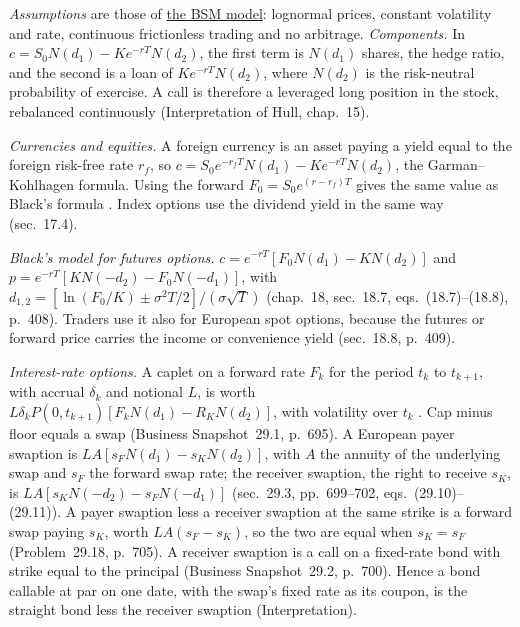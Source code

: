 \begin{qfmethod}\label{meth:black-model-rates-currencies}
 \emph{Assumptions} are those of \hyperref[mod:black-scholes-merton]{the BSM model}: lognormal prices, constant volatility and rate, continuous frictionless trading and no arbitrage. \emph{Components.} In $c=S_0N(d_1)-Ke^{-rT}N(d_2)$, the first term is $N(d_1)$ shares, the hedge ratio, and the second is a loan of $Ke^{-rT}N(d_2)$, where $N(d_2)$ is the risk-neutral probability of exercise. A call is therefore a leveraged long position in the stock, rebalanced continuously (Interpretation of Hull, chap.~15).

\emph{Currencies and equities.} A foreign currency is an asset paying a yield equal to the foreign risk-free rate $r_f$, so $c=S_0e^{-r_fT}N(d_1)-Ke^{-rT}N(d_2)$, the Garman--Kohlhagen formula. Using the forward $F_0=S_0e^{(r-r_f)T}$ gives the same value as Black's formula \citep[chap.~17, sec.~17.5, eqs.~(17.11)--(17.14), pp.~394--395]{s7-hulloptions}. Index options use the dividend yield in the same way (sec.~17.4).

\emph{Black's model for futures options.} $c=e^{-rT}[F_0N(d_1)-KN(d_2)]$ and $p=e^{-rT}[KN(-d_2)-F_0N(-d_1)]$, with $d_{1,2}=[\ln(F_0/K)\pm\sigma^2T/2]/(\sigma\sqrt T)$ (chap.~18, sec.~18.7, eqs.~(18.7)--(18.8), p.~408). Traders use it also for European spot options, because the futures or forward price carries the income or convenience yield (sec.~18.8, p.~409).

\emph{Interest-rate options.} A caplet on a forward rate $F_k$ for the period $t_k$ to $t_{k+1}$, with accrual $\delta_k$ and notional $L$, is worth $L\delta_kP(0,t_{k+1})[F_kN(d_1)-R_KN(d_2)]$, with volatility over $t_k$ \citep[chap.~29, sec.~29.2, eq.~(29.7), pp.~695--696]{s7-hulloptions}. Cap minus floor equals a swap (Business Snapshot~29.1, p.~695). A European payer swaption is $LA[s_FN(d_1)-s_KN(d_2)]$, with $A$ the annuity of the underlying swap and $s_F$ the forward swap rate; the receiver swaption, the right to receive $s_K$, is $LA[s_KN(-d_2)-s_FN(-d_1)]$ (sec.~29.3, pp.~699--702, eqs.~(29.10)--(29.11)). A payer swaption less a receiver swaption at the same strike is a forward swap paying $s_K$, worth $LA(s_F-s_K)$, so the two are equal when $s_K=s_F$ (Problem~29.18, p.~705). A receiver swaption is a call on a fixed-rate bond with strike equal to the principal (Business Snapshot~29.2, p.~700). Hence a bond callable at par on one date, with the swap's fixed rate as its coupon, is the straight bond less the receiver swaption (Interpretation).


\end{qfmethod}
